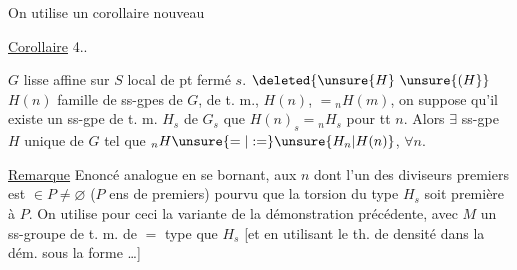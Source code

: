 On utilise un corollaire nouveau 
\margin{\unsure{!!}}

\uline{Corollaire} 4.. 

$G$ lisse affine sur $S$ local de pt fermé $s$. $\deleted{\unsure{H}\ \unsure{(H}}$ $H(n)$ famille de ss-gpes de $G$, de t. m., $H(n)$, $={}_nH(m)$, on suppose qu'il existe un ss-gpe de t. m. $H_s$ de $G_s$  que $H(n)_s={}_nH_s$ pour tt $n$. Alors $\exists$ ss-gpe $H$  unique de $G$ tel que $ {}_nH\unsure{=|\mathrel{:=}} \unsure{H_n|H(n)}$, $\forall n$.

\uline{Remarque}  Enoncé analogue en se bornant, aux $n$ dont l'un des diviseurs premiers est $\in P\ne\varnothing$ ($P$ ens de  premiers) pourvu que la torsion du type $H_s$ soit première à $P$. On utilise pour ceci la variante de la démonstration précédente, avec $M$  un  ss-groupe de t. m. de $=$ type que $H_s$ [et en  utilisant le th. de densité dans la dém. sous la forme \ldots]
